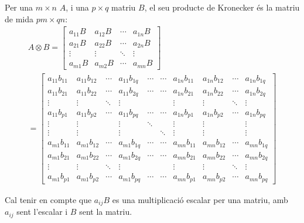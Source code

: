 Per una $m \times n$ $A$, i una $p \times q$ matriu $B$, el seu producte de Kronecker \cite{QCandQI:kronecker} és la matriu de mida $pm \times qn$: 
\begin{multline*}
A \otimes B = \begin{bmatrix}
	a_{11} B & a_{12} B & \cdots & a_{1n}B \\
	a_{21} B & a_{22} B & \cdots & a_{2n}B \\
	\vdots & \vdots & \ddots &           \vdots \\
	a_{m1} B & a_{m2} B & \cdots & a_{mn} B
\end{bmatrix} \\
= \begin{bmatrix}
a_{11} b_{11} & a_{11} b_{12} & \cdots & a_{11} b_{1q} &
\cdots & \cdots & a_{1n} b_{11} & a_{1n} b_{12} & \cdots & a_{1n} b_{1q} \\
a_{11} b_{21} & a_{11} b_{22} & \cdots & a_{11} b_{2q} &
\cdots & \cdots & a_{1n} b_{21} & a_{1n} b_{22} & \cdots & a_{1n} b_{2q} \\
\vdots & \vdots & \ddots & \vdots & & & \vdots & \vdots & \ddots & \vdots \\
a_{11} b_{p1} & a_{11} b_{p2} & \cdots & a_{11} b_{pq} &
\cdots & \cdots & a_{1n} b_{p1} & a_{1n} b_{p2} & \cdots & a_{1n} b_{pq} \\
\vdots & \vdots & & \vdots & \ddots & & \vdots & \vdots & & \vdots \\
\vdots & \vdots & & \vdots & & \ddots & \vdots & \vdots & & \vdots \\
a_{m1} b_{11} & a_{m1} b_{12} & \cdots & a_{m1} b_{1q} &
\cdots & \cdots & a_{mn} b_{11} & a_{mn} b_{12} & \cdots & a_{mn} b_{1q} \\
a_{m1} b_{21} & a_{m1} b_{22} & \cdots & a_{m1} b_{2q} &
\cdots & \cdots & a_{mn} b_{21} & a_{mn} b_{22} & \cdots & a_{mn} b_{2q} \\
\vdots & \vdots & \ddots & \vdots & & & \vdots & \vdots & \ddots & \vdots \\
a_{m1} b_{p1} & a_{m1} b_{p2} & \cdots & a_{m1} b_{pq} &
\cdots & \cdots & a_{mn} b_{p1} & a_{mn} b_{p2} & \cdots & a_{mn} b_{pq}
\end{bmatrix}
\end{multline*}

Cal tenir en compte que $a_{ij}B$ es una multiplicació escalar per una matriu, amb $a_{ij}$ sent l'escalar i $B$ sent la matriu. 

